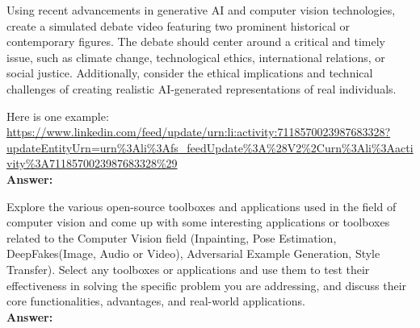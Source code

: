 \documentclass[12pt, a4paper]{exam}
\begin{document}
\begin{questions}

	\pointsdroppedatright
	\question Using recent advancements in generative AI and computer vision technologies, create a simulated debate video featuring two prominent historical or contemporary figures. The debate should center around a critical and timely issue, such as climate change, technological ethics, international relations, or social justice. Additionally, consider the ethical implications and technical challenges of creating realistic AI-generated representations of real individuals.

 Here is one example: \url{https://www.linkedin.com/feed/update/urn:li:activity:7118570023987683328?updateEntityUrn=urn%3Ali%3Afs_feedUpdate%3A%28V2%2Curn%3Ali%3Aactivity%3A7118570023987683328%29} \\
 
\vspace{0.2in}
\textbf{Answer:}



\vspace{0.2in}
    \pointsdroppedatright
	
	\question Explore the various open-source toolboxes and applications used in the field of computer vision and come up with some interesting applications or toolboxes related to the Computer Vision field (Inpainting, Pose Estimation, DeepFakes(Image, Audio or Video), Adversarial Example Generation, Style Transfer). Select any toolboxes or applications and use them to test their effectiveness in solving the specific problem you are addressing, and discuss their core functionalities, advantages, and real-world applications.\\
\vspace{0.2in}
\textbf{Answer:}



\vspace{0.2in}


\end{questions}
\end{document}
